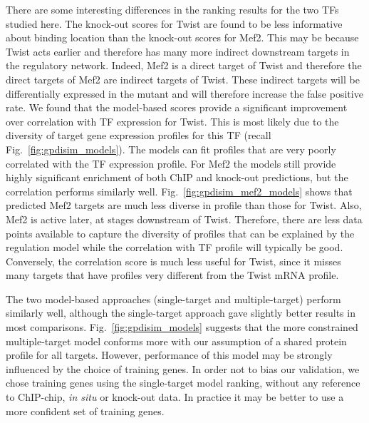 \documentclass{pnastwo}
\begin{document}
\begin{article}
There are some interesting differences in the ranking results for the two TFs studied
here. The knock-out scores for Twist are found to be less informative
about binding location than the knock-out scores for Mef2. This may be
because Twist acts earlier and therefore has many more indirect
downstream targets in the regulatory network. Indeed, Mef2 is a
direct target of Twist and therefore the direct targets of Mef2 are
indirect targets of Twist. These indirect targets will be
differentially expressed in the mutant and will therefore increase the
false positive rate. We found that the model-based scores provide 
a significant improvement over correlation with TF expression for Twist. 
This is most likely due to the diversity of target gene expression profiles
 for this TF (recall Fig.~\ref{fig:gpdisim_models}). The models can fit 
profiles that are very poorly correlated with the TF expression profile. For Mef2
the models still provide highly significant enrichment of both ChIP and knock-out 
predictions, but the correlation performs similarly well. Fig.~\ref{fig:gpdisim_mef2_models} 
shows that predicted Mef2 targets are much less diverse in profile than those for Twist. Also, Mef2 is
active later, at stages downstream of Twist. Therefore, there
are less data points available to capture the diversity of profiles
that can be explained by the regulation model while the correlation with TF profile will typically be good. Conversely, the
correlation score is much less useful for Twist, since it misses many
targets that have profiles very different from the Twist mRNA profile. 

The two model-based approaches (single-target and multiple-target) perform 
similarly well, although the single-target approach gave slightly better results in 
most comparisons. Fig.~\ref{fig:gpdisim_models} suggests that the more constrained 
multiple-target model conforms more with our assumption of a shared protein 
profile for all targets. However, performance of this model may be strongly
influenced by the choice of training genes. In order not to bias our validation, 
we chose training genes using the single-target model ranking, without any reference
to ChIP-chip, {\it in situ} or knock-out data. In practice it may be better to use a more 
confident set of training genes. 


\end{article}
\end{document}
